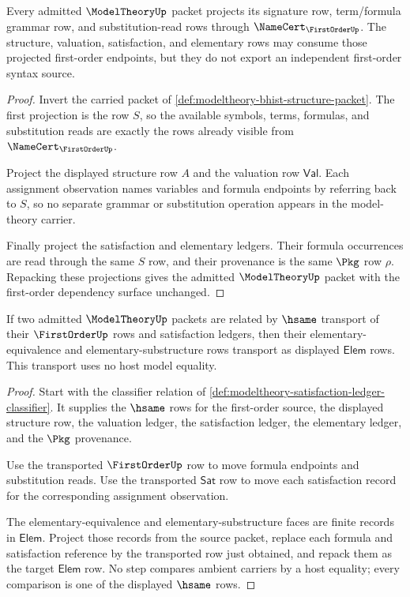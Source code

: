 \begin{theorem}\label{thm:modeltheory-firstorder-dependency-surface}
Every admitted $\ModelTheoryUp$ packet projects its signature row,
term/formula grammar row, and substitution-read rows through
$\NameCert_{\FirstOrderUp}$. The structure, valuation, satisfaction, and
elementary rows may consume those projected first-order endpoints, but they
do not export an independent first-order syntax source.
\end{theorem}
\begin{proof}
Invert the carried packet of
\autoref{def:modeltheory-bhist-structure-packet}. The first projection is the
row $S$, so the available symbols, terms, formulas, and substitution reads
are exactly the rows already visible from $\NameCert_{\FirstOrderUp}$.

Project the displayed structure row $A$ and the valuation row
$\mathsf{Val}$. Each assignment observation names variables and formula
endpoints by referring back to $S$, so no separate grammar or substitution
operation appears in the model-theory carrier.

Finally project the satisfaction and elementary ledgers. Their formula
occurrences are read through the same $S$ row, and their provenance is the
same $\Pkg$ row $\rho$. Repacking these projections gives the admitted
$\ModelTheoryUp$ packet with the first-order dependency surface unchanged.
\end{proof}

\begin{theorem}\label{thm:modeltheory-elementary-equivalence-transport}
If two admitted $\ModelTheoryUp$ packets are related by $\hsame$ transport of
their $\FirstOrderUp$ rows and satisfaction ledgers, then their
elementary-equivalence and elementary-substructure rows transport as
displayed $\mathsf{Elem}$ rows. This transport uses no host model equality.
\end{theorem}
\begin{proof}
Start with the classifier relation of
\autoref{def:modeltheory-satisfaction-ledger-classifier}. It supplies the
$\hsame$ rows for the first-order source, the displayed structure row, the
valuation ledger, the satisfaction ledger, the elementary ledger, and the
$\Pkg$ provenance.

Use the transported $\FirstOrderUp$ row to move formula endpoints and
substitution reads. Use the transported $\mathsf{Sat}$ row to move each
satisfaction record for the corresponding assignment observation.

The elementary-equivalence and elementary-substructure faces are finite
records in $\mathsf{Elem}$. Project those records from the source packet,
replace each formula and satisfaction reference by the transported row just
obtained, and repack them as the target $\mathsf{Elem}$ row. No step compares
ambient carriers by a host equality; every comparison is one of the displayed
$\hsame$ rows.
\end{proof}

